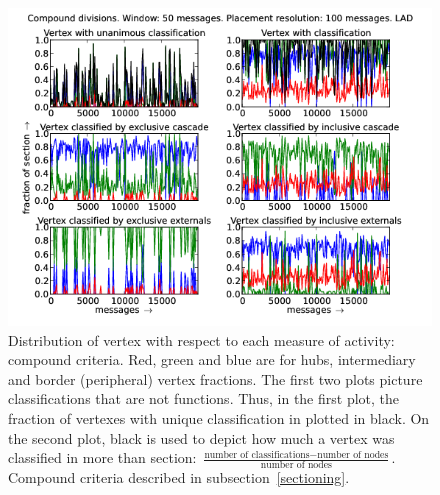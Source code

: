 \documentclass[%
 aip,
 jmp,%
 amsmath,amssymb,
 reprint,%
]{revtex4-1}
\begin{document}
\begin{figure}[hbtp] 
   \centering
        \includegraphics[width=\textwidth]{figs/LAD/50_2}
    \caption{Distribution of vertex with respect to each measure of activity: compound criteria. Red, green and blue are for hubs, intermediary and border (peripheral) vertex fractions. The first two plots picture classifications that are not functions. Thus, in the first plot, the fraction of vertexes with unique classification in plotted in black. On the second plot, black is used to depict how much a vertex was classified in more than section: $\frac{\text{number of classifications} - \text{number of nodes}}{\text{number of nodes}}$. Compound criteria described in subsection~\ref{sectioning}.}
    \label{fig:lad50_}
\end{figure}





%
%




\nocite{*}
\end{document}
